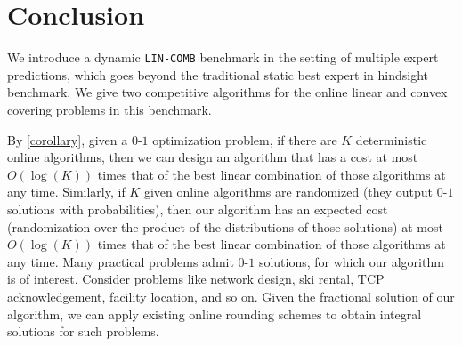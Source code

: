 
\section{Conclusion} \label{sec:conclusion}

We introduce a dynamic \texttt{LIN-COMB} benchmark in the setting of multiple expert predictions, which goes beyond the traditional static best expert in hindsight benchmark. We give two competitive algorithms for the online linear and convex covering problems in this benchmark.

By \cref{corollary}, given a $0$-$1$ optimization problem, if there are $K$ deterministic online algorithms, then
we can design an algorithm that has a cost at most $O(\log (K))$ times that of the best linear combination of those algorithms at any time.
Similarly, if $K$ given online algorithms are randomized (they output $0$-$1$ solutions with probabilities), then our algorithm
has an expected cost (randomization over the product of the distributions of those solutions) at most $O(\log(K))$ times that of
the best linear combination of those algorithms at any time. Many practical problems admit $0$-$1$ solutions, for which our algorithm is of interest.
Consider problems like network design, ski rental, TCP acknowledgement, facility location, and so on. Given the fractional solution of our algorithm,
we can apply existing online rounding schemes to obtain integral solutions for such problems.

